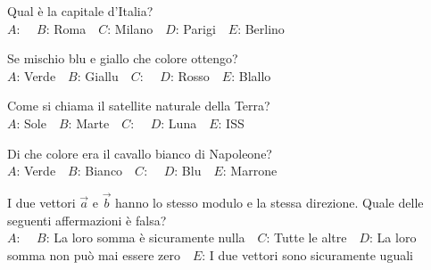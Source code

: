 \mcquestionfooter



\def\mcquestionnumber{2}


\mcquestionheader Qual è la capitale d’Italia?\\
{$A$}: \ \ {$B$}: Roma\ \ {$C$}: Milano\ \ {$D$}: Parigi\ \ {$E$}: Berlino\ \ 

\mcquestionfooter



\def\mcquestionnumber{3}


\mcquestionheader Se mischio blu e giallo che colore ottengo?\\
{$A$}: Verde\ \ {$B$}: Giallu\ \ {$C$}: \ \ {$D$}: Rosso\ \ {$E$}: Blallo\ \ 

\mcquestionfooter



\def\mcquestionnumber{4}


\mcquestionheader Come si chiama il satellite naturale della Terra?\\
{$A$}: Sole\ \ {$B$}: Marte\ \ {$C$}: \ \ {$D$}: Luna\ \ {$E$}: ISS\ \ 

\mcquestionfooter



\def\mcquestionnumber{5}


\mcquestionheader Di che colore era il cavallo bianco di Napoleone?\\
{$A$}: Verde\ \ {$B$}: Bianco\ \ {$C$}: \ \ {$D$}: Blu\ \ {$E$}: Marrone\ \ 

\mcquestionfooter



\def\mcquestionnumber{6}


\mcquestionheader I due vettori $\vec{a}$ e $\vec{b}$ hanno lo stesso modulo e la stessa direzione. Quale delle seguenti affermazioni è falsa?\\
{$A$}: \ \ {$B$}: La loro somma è sicuramente nulla\ \ {$C$}: Tutte le altre\ \ {$D$}: La loro somma non può mai essere zero\ \ {$E$}: I due vettori sono sicuramente uguali\ \ 

\mcquestionfooter



\def\mcquestionnumber{7}


